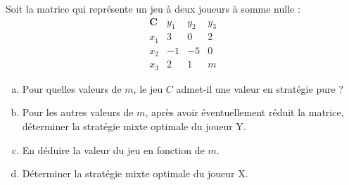\documentclass[french,11pt,leqno]{article}
\newcounter{exocount}
\newcounter{questcount}
\def\exo{\bigskip\noindent{\bf Exercice \theexocount {} -}
  \addtocounter{exocount}{1} \setcounter{questcount}{1}}
\begin{document}
\medskip

\exo 
Soit la matrice qui repr\'esente un jeu \`a deux joueurs \`a somme nulle :
\begin{equation*}
\begin{array}{l|rrr}
\mathbf{C} & y_1 & y_2 & y_3   \\ \hline
x_1 &3&0&2\\
x_2 &-1&-5&0\\
x_3 &2&1&m
\end{array}%
\end{equation*}
\begin{enumerate}[a)]
\item Pour quelles valeurs de $m$, le jeu $C$ admet-il une valeur en strat\'egie pure ?
\item Pour les autres valeurs de $m$, apr\`es avoir \'eventuellement r\'eduit la matrice, d\'eterminer la strat\'egie mixte optimale du joueur Y. 
\item En d\'eduire la valeur du jeu en fonction de $m$.
\item D\'eterminer la strat\'egie mixte optimale du joueur X. 
\end{enumerate}


\medskip
\medskip
\end{document}
